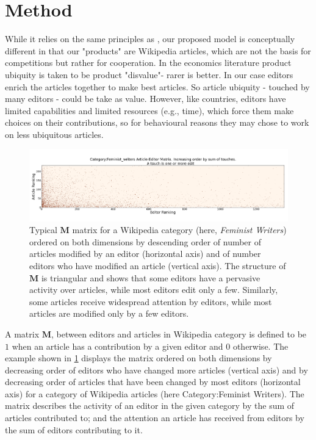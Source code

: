 \section{Method}
While it relies on the same principles as \cite{caldarelli2012network}, our proposed model is conceptually different in that our "products" are Wikipedia articles, which are not the basis for competitions but rather for cooperation. In the economics literature product ubiquity is taken to be product "disvalue"- rarer is better. In our case editors enrich the articles together to make best articles. So article ubiquity - touched by many editors - could be take as value.  However, like countries, editors have limited capabilities and limited resources (e.g., time), which force them make choices on their contributions, so for behavioural reasons they may chose to work on less ubiquitous articles.

\begin{figure}[!t]
\centering
\includegraphics[width=2.0\columnwidth]{Figures/Category_Feminist_writerstriangle_matrix_corrected.png}
\caption{Typical $\mathbf{M}$ matrix for a Wikipedia category (here, {\it Feminist Writers}) ordered on both dimensions by descending order of number of articles modified by an editor (horizontal axis) and of number editors who have modified an article (vertical axis). The structure of $\mathbf{M}$ is triangular and shows that some editors have a pervasive activity over articles, while most editors edit only a few. Similarly, some articles receive widespread attention by editors, while most articles are modified only by a few editors.}
\label{fig:triangle}
\end{figure}


A matrix $\mathbf{M}$, between editors and articles in Wikipedia category is defined to be $1$ when an article has a contribution by a given editor and $0$ otherwise. The example shown in \ref{fig:triangle} displays the matrix ordered on both dimensions by decreasing order of editors who have changed more articles (vertical axis) and by decreasing order of articles that have been changed by most editors (horizontal axis) for a category of Wikipedia articles (here Category:Feminist Writers). The matrix describes the activity of an editor in the given category by the sum of articles contributed to; and the attention an article has received from editors by the sum of editors contributing to it. 

